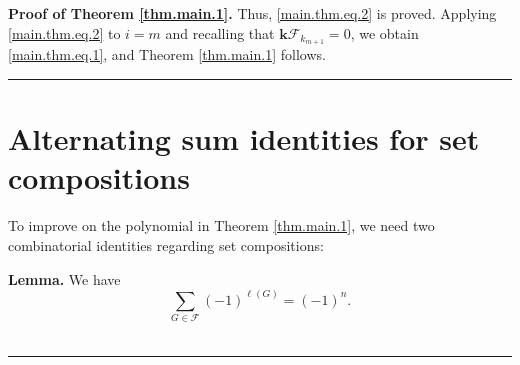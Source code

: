 \documentclass[12pt]{article}
\theoremstyle{definition}%
\newtheorem{lem}[thm]{Lemma}
\theoremstyle{definition}%
\theoremstyle{remark}%
\newcommand{\tup}[1]{\left( #1 \right)}
\newcommand{\kk}{\mathbf{k}}
\newcommand{\kf}{\kk\mathcal{F}}
\newcommand{\CF}{\mathcal{F}}
\newenvironment{lem}[1][Lemma]{\noindent\textbf{#1.} }{\ \rule{0.5em}{0.5em}}
\newenvironment{proof}[1][Proof]{\noindent\textbf{#1.} }{\ \rule{0.5em}{0.5em}}
\begin{document}
\begin{proof}[Proof of Theorem \ref{thm.main.1}]
Thus, \eqref{main.thm.eq.2} is proved.
Applying \eqref{main.thm.eq.2} to $i=m$
and recalling that $\kf_{k_{m+1}}=0$, we obtain
\eqref{main.thm.eq.1}, and Theorem \ref{thm.main.1} follows.  
\end{proof}

\section{\label{sec.altsum}Alternating sum identities for set compositions}

To improve on the polynomial in Theorem \ref{thm.main.1},
we need two combinatorial identities regarding set compositions:

\begin{lem}
\label{lem.altsum.faces-all}
We have
\[
    \sum_{G \in \CF} \tup{ -1 }^{\ell\tup{ G }}  = \tup{ -1 }^n.
\]
\end{lem}
\end{document}
